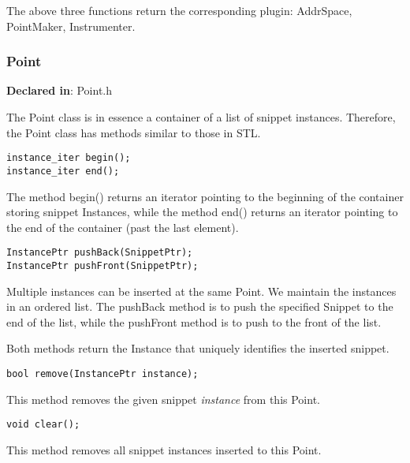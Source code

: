 The above three functions return the corresponding plugin: AddrSpace,
PointMaker, Instrumenter.

\subsubsection{Point}
\label{sec-3.1.2}

\textbf{Declared in}: Point.h

The Point class is in essence a container of a list of snippet
instances. Therefore, the Point class has methods similar to those in STL.


\begin{verbatim}
instance_iter begin();
instance_iter end();

\end{verbatim}



The method begin() returns an iterator pointing to the beginning of the
container storing snippet Instances, while the method end() returns an iterator
pointing to the end of the container (past the last element).


\begin{verbatim}
InstancePtr pushBack(SnippetPtr);
InstancePtr pushFront(SnippetPtr);

\end{verbatim}



Multiple instances can be inserted at the same Point. We maintain the instances
in an ordered list. The pushBack method is to push the specified Snippet to the
end of the list, while the pushFront method is to push to the front of the
list.

Both methods return the Instance that uniquely identifies the inserted snippet.


\begin{verbatim}
bool remove(InstancePtr instance);

\end{verbatim}



This method removes the given snippet \emph{instance} from this Point.


\begin{verbatim}
void clear();

\end{verbatim}



This method removes all snippet instances inserted to this Point.


